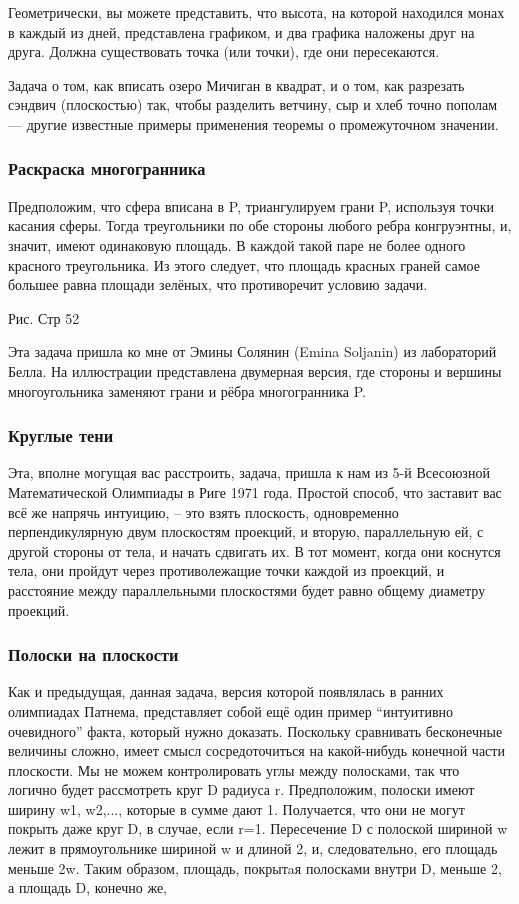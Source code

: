 Геометрически, вы можете представить, что высота, на которой находился монах в каждый из дней, представлена графиком, и два графика наложены друг на друга.
Должна существовать точка (или точки), где они пересекаются.

Задача о том, как вписать озеро Мичиган в квадрат, и о том, как разрезать сэндвич (плоскостью) так, чтобы разделить ветчину, сыр и хлеб точно пополам --- другие известные примеры применения теоремы о промежуточном значении.


\subsubsection*{Раскраска многогранника}%

Предположим, что сфера вписана в P, триангулируем грани P, используя точки касания сферы.
Тогда треугольники по обе стороны любого ребра конгруэнтны, и, значит, имеют одинаковую площадь.
В каждой такой паре не более одного красного треугольника.
Из этого следует, что площадь красных граней самое большее равна площади зелёных, что противоречит условию задачи.

Рис. Стр 52

Эта задача пришла ко мне от Эмины Солянин (Emina Soljanin) из лабораторий Белла.
На иллюстрации представлена двумерная версия, где стороны и вершины многоугольника заменяют грани и рёбра многогранника P.

\subsubsection*{Круглые тени}%

Эта, вполне могущая вас расстроить, задача, пришла к нам из 5-й Всесоюзной Математической Олимпиады в Риге 1971 года.
Простой способ, что заставит вас всё же напрячь интуицию, -- это взять плоскость, одновременно перпендикулярную двум плоскостям проекций, и вторую, параллельную ей, с другой стороны от тела, и начать сдвигать их.
В тот момент, когда они коснутся тела, они пройдут через противолежащие точки каждой из проекций, и расстояние между параллельными плоскостями будет равно общему диаметру проекций.


\subsubsection*{Полоски на плоскости}%

Как и предыдущая, данная задача, версия которой появлялась в ранних олимпиадах Патнема, представляет собой ещё один пример “интуитивно очевидного” факта, который нужно доказать.
Поскольку сравнивать бесконечные величины сложно, имеет смысл сосредоточиться на какой-нибудь конечной части плоскости.
Мы не можем контролировать углы между полосками, так что логично будет рассмотреть круг D радиуса r.
Предположим, полоски имеют ширину w1, w2,..., которые в сумме дают 1.
Получается, что они не могут покрыть даже круг D, в случае, если r=1.
Пересечение D с полоской шириной w лежит в прямоугольнике шириной w и длиной 2, и, следовательно, его площадь меньше 2w.
Таким образом, площадь, покрытaя полосками внутри D, меньше 2, а площадь D, конечно же, 

